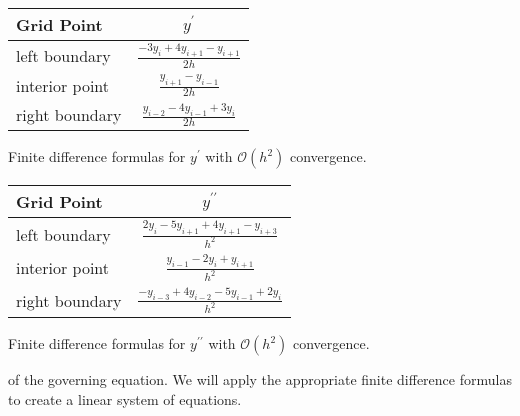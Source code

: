 \begin{margintable}
\begin{tabular}{l | c}
\hline
Grid Point & $y^{\prime}$ \\ \hline
left boundary & $\frac{-3y_i + 4y_{i+1} - y_{i+1}}{2h}$ \\ \hline 
interior point & $\frac{y_{i+1}-y_{i-1}}{2h} $ \\ \hline
right boundary & $\frac{y_{i-2}-4y_{i-1}+3y_i}{2h}$ \\ \hline
\end{tabular}
\caption{Finite difference formulas for $y^{\prime}$ with $\mathcal{O}(h^2)$ convergence.}
\label{tab:lec31n-fd-formulas-yp}
\end{margintable}

\begin{margintable}
\begin{tabular}{l | c}
\hline
Grid Point & $y^{\prime \prime}$ \\ \hline
left boundary & $\frac{2y_i-5y_{i+1}+4y_{i+1}-y_{i+3}}{h^2}$ \\ \hline 
interior point & $\frac{y_{i-1}-2y_i+y_{i+1}}{h^2} $ \\ \hline
right boundary & $\frac{-y_{i-3}+4y_{i-2}-5y_{i-1}+2y_i}{h^2}$ \\ \hline
\end{tabular}
\caption{Finite difference formulas for $y^{\prime \prime}$ with $\mathcal{O}(h^2)$ convergence.}
\label{tab:lec31n-fd-formulas-ypp}
\end{margintable}

 of the governing equation.  We will apply the appropriate finite difference formulas to create a linear system of equations.

